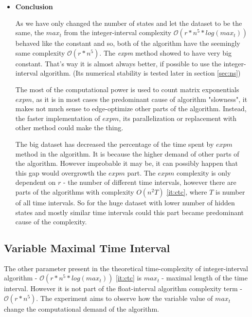 \documentclass[thesis=M,english]{FITthesis}[2012/10/20]
\begin{document}
\begin{itemize}
\item \textbf{ Conclusion }

As we have only changed the number of states and let the dataset to be the same, the $max_t$ from the integer-interval complexity $\mathcal{O}(r*n^5*log(max_t))$ behaved like the constant and so, both of the algorithm have the seemingly same complexity $\mathcal{O}(r*n^5)$. The \textit{expm} method showed to have very big constant. That's way it is almost always better, if possible to use the integer-interval algorithm. (Its numerical stability is tested later in section \ref{sec:ns}) 

The most of the computational power is used to count matrix exponentials $expm$, as it is in most cases the predominant cause of algorithm "slowness", it makes not much sense to edge-optimize other parts of the algorithm. Instead, the faster implementation of $expm$, its parallelization or replacement with other method could make the thing.      

The big dataset \label{fig:e2big} has decreased the percentage of the time spent by $expm$ method in the algorithm. It is because the higher demand of other parts of the algorithm. However improbable it may be, it can possibly happen that this gap would overgrowth the $expm$ part. The $expm$ complexity is only dependent on $r$ - the number of different time intervals, however there are parts of the algorithms with complexity ${O}(n^2T)$ \ref{it:ctc}, where $T$ is number of all time intervals. So for the huge dataset with lower number of hidden states and mostly similar time intervals could this part became predominant cause of the complexity.   

\end{itemize}

\subsection{Variable Maximal Time Interval}

The other parameter present in the theoretical time-complexity of integer-interval algorithm - $\mathcal{O}(r*n^5*log(max_t))$ \ref{it:ctc} is $max_t$ - maximal length of the time interval. However it is not part of the float-interval algorithm complexity term - $\mathcal{O}(r*n^5)$. The experiment aims to observe how the variable value of $max_t$ change the computational demand of the algorithm.  
\end{document}
